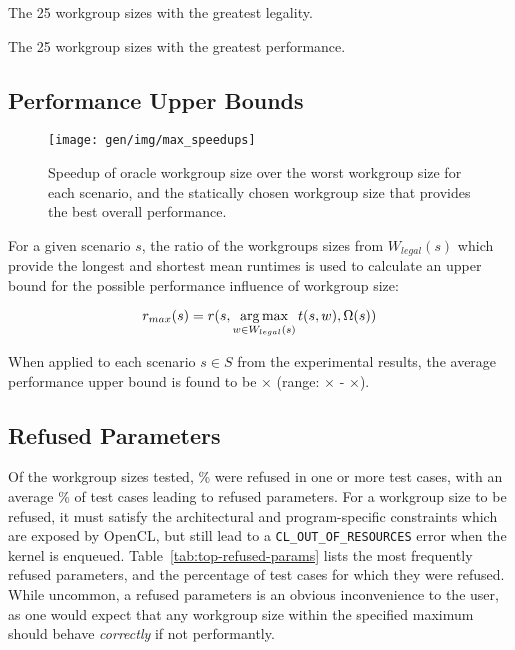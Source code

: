 \begin{table}
  \parbox{.45\linewidth}{
    \centering
    \scriptsize
    
    \caption{The 25 workgroup sizes with the greatest legality.}
  }
  \hfill
  \parbox{.45\linewidth}{
    \centering
    \scriptsize
    
    \caption{The 25 workgroup sizes with the greatest performance.}
  }
\end{table}


\subsection{Performance Upper Bounds}

\begin{figure}
\texttt{[image: gen/img/max\_speedups]}
\caption{%
  Speedup of oracle workgroup size over the worst workgroup size for
  each scenario, and the statically chosen workgroup size that
  provides the best overall performance.%
}
\label{fig:speedups}
\end{figure}

For a given scenario $s$, the ratio of the workgroups sizes from
$W_{legal}(s)$ which provide the longest and shortest mean runtimes is
used to calculate an upper bound for the possible performance
influence of workgroup size:

\begin{equation}
r_{max}(s) = r(s, \operatorname*{arg\,max}_{w \in W_{legal}(s)} t(s,w), \Omega(s))
\end{equation}

When applied to each scenario $s \in S$ from the experimental results,
the average performance upper bound is found to be
$\times$ (range:
$\times$ -
$\times$).



\subsection{Refused Parameters}

Of the  workgroup sizes tested,
\% were refused in one or more test
cases, with an average \% of test
cases leading to refused parameters. For a workgroup size to be
refused, it must satisfy the architectural and program-specific
constraints which are exposed by OpenCL, but still lead to a
\texttt{CL\_OUT\_OF\_RESOURCES} error when the kernel is
enqueued. Table~\ref{tab:top-refused-params} lists the most frequently
refused parameters, and the percentage of test cases for which they
were refused. While uncommon, a refused parameters is an obvious
inconvenience to the user, as one would expect that any workgroup size
within the specified maximum should behave \emph{correctly} if not
performantly.

